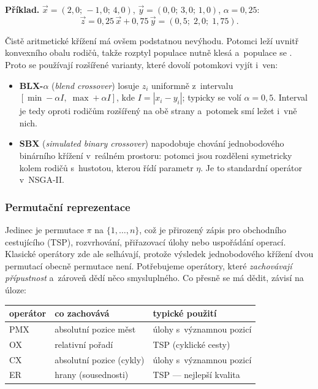 \documentclass[11pt,a4paper]{article}
\theoremstyle{definition}
\begin{document}
\textbf{Příklad.} $\vec x = (2{,}0;\, -1{,}0;\, 4{,}0)$,
$\vec y = (0{,}0;\, 3{,}0;\, 1{,}0)$, $\alpha = 0{,}25$:
\[
\vec z = 0{,}25\,\vec x + 0{,}75\,\vec y = (0{,}5;\; 2{,}0;\; 1{,}75).
\]

Čistě aritmetické křížení má ovšem podstatnou nevýhodu. Potomci leží uvnitř konvexního
obalu rodičů, takže rozptyl populace nutně klesá a~populace se . Proto se
používají rozšířené varianty, které dovolí potomkovi vyjít i~ven:
\begin{itemize}
\item \textbf{BLX-$\alpha$} (\emph{blend crossover}) losuje $z_i$ uniformně z~intervalu
  $[\min - \alpha I,\; \max + \alpha I]$, kde $I = |x_i - y_i|$; typicky se volí
  $\alpha = 0{,}5$. Interval je tedy oproti rodičům rozšířený na obě strany a~potomek
  smí ležet i~vně nich.
\item \textbf{SBX} (\emph{simulated binary crossover}) napodobuje chování jednobodového
  binárního křížení v~reálném prostoru: potomci jsou rozděleni symetricky kolem rodičů
  s~hustotou, kterou řídí parametr $\eta$. Je to standardní operátor v~NSGA-II.
\end{itemize}

\subsubsection{Permutační reprezentace}

Jedinec je permutace $\pi$ na $\{1,\dots,n\}$, což je přirozený zápis pro obchodního
cestujícího (TSP), rozvrhování, přiřazovací úlohy nebo uspořádání operací. Klasické
operátory zde ale selhávají, protože výsledek jednobodového křížení dvou permutací
obecně permutace není. Potřebujeme operátory, které \emph{zachovávají přípustnost}
a~zároveň dědí něco smysluplného. Co přesně se má dědit, závisí na úloze:

\begin{center}
\begin{tabular}{@{}lll@{}}
\toprule
\textbf{operátor} & \textbf{co zachovává} & \textbf{typické použití} \\
\midrule
PMX & absolutní pozice měst & úlohy s~významnou pozicí \\
OX & relativní pořadí & TSP (cyklické cesty) \\
CX & absolutní pozice (cykly) & úlohy s~významnou pozicí \\
ER & hrany (sousednosti) & TSP --- nejlepší kvalita \\
\bottomrule
\end{tabular}
\end{center}
\end{document}
